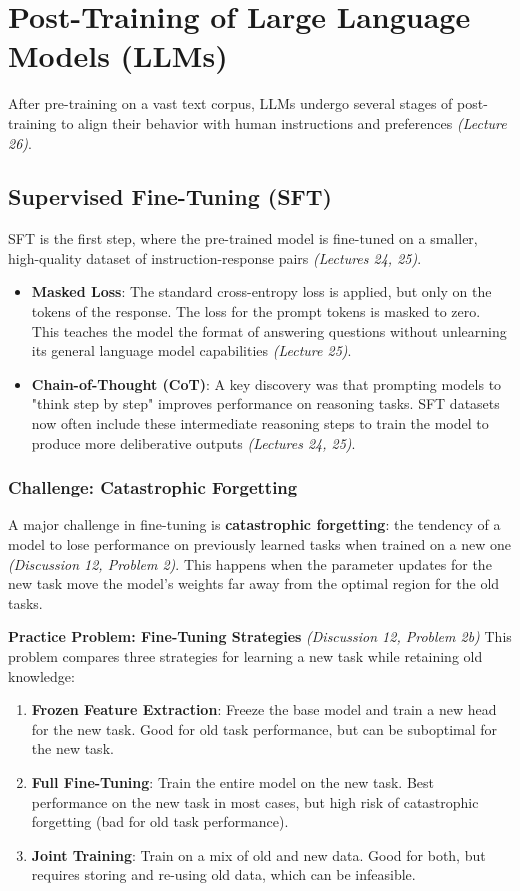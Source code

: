 \documentclass[11pt]{article}
\begin{document}
\section{Post-Training of Large Language Models (LLMs)}
After pre-training on a vast text corpus, LLMs undergo several stages of post-training to align their behavior with human instructions and preferences \textit{(Lecture 26)}.

\subsection{Supervised Fine-Tuning (SFT)}
SFT is the first step, where the pre-trained model is fine-tuned on a smaller, high-quality dataset of instruction-response pairs \textit{(Lectures 24, 25)}.
\begin{itemize}
    \item \textbf{Masked Loss}: The standard cross-entropy loss is applied, but only on the tokens of the response. The loss for the prompt tokens is masked to zero. This teaches the model the format of answering questions without unlearning its general language model capabilities \textit{(Lecture 25)}.
    \item \textbf{Chain-of-Thought (CoT)}: A key discovery was that prompting models to "think step by step" improves performance on reasoning tasks. SFT datasets now often include these intermediate reasoning steps to train the model to produce more deliberative outputs \textit{(Lectures 24, 25)}.
\end{itemize}

\subsubsection{Challenge: Catastrophic Forgetting}
A major challenge in fine-tuning is \textbf{catastrophic forgetting}: the tendency of a model to lose performance on previously learned tasks when trained on a new one \textit{(Discussion 12, Problem 2)}. This happens when the parameter updates for the new task move the model's weights far away from the optimal region for the old tasks.

\textbf{Practice Problem: Fine-Tuning Strategies} \textit{(Discussion 12, Problem 2b)}
This problem compares three strategies for learning a new task while retaining old knowledge:
\begin{enumerate}
    \item \textbf{Frozen Feature Extraction}: Freeze the base model and train a new head for the new task. Good for old task performance, but can be suboptimal for the new task.
    \item \textbf{Full Fine-Tuning}: Train the entire model on the new task. Best performance on the new task in most cases, but high risk of catastrophic forgetting (bad for old task performance).
    \item \textbf{Joint Training}: Train on a mix of old and new data. Good for both, but requires storing and re-using old data, which can be infeasible.
\end{enumerate}
\end{document}
